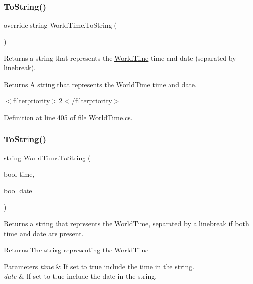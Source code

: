 \subsubsection{\texorpdfstring{To\+String()}{ToString()}\hspace{0.1cm}{\footnotesize\ttfamily [3/4]}}
{\footnotesize\ttfamily override string World\+Time.\+To\+String (\begin{DoxyParamCaption}{ }\end{DoxyParamCaption})}



Returns a string that represents the \hyperlink{struct_world_time}{World\+Time} time and date (separated by linebreak). 

\begin{DoxyReturn}{Returns}
A string that represents the \hyperlink{struct_world_time}{World\+Time} time and date.
\end{DoxyReturn}
$<$filterpriority$>$2$<$/filterpriority$>$ 

Definition at line 405 of file World\+Time.\+cs.

\mbox{\label{struct_world_time_aa38d53e5d04fd8a24ef379f215bea622}} 
\subsubsection{\texorpdfstring{To\+String()}{ToString()}\hspace{0.1cm}{\footnotesize\ttfamily [4/4]}}
{\footnotesize\ttfamily string World\+Time.\+To\+String (\begin{DoxyParamCaption}\item[{bool}]{time,  }\item[{bool}]{date }\end{DoxyParamCaption})}



Returns a string that represents the \hyperlink{struct_world_time}{World\+Time}, separated by a linebreak if both time and date are present. 

\begin{DoxyReturn}{Returns}
The string representing the \hyperlink{struct_world_time}{World\+Time}.
\end{DoxyReturn}

\begin{DoxyParams}{Parameters}
{\em time} & If set to {\ttfamily true} include the time in the string.\\
\hline
{\em date} & If set to {\ttfamily true} include the date in the string.\\
\hline
\end{DoxyParams}


